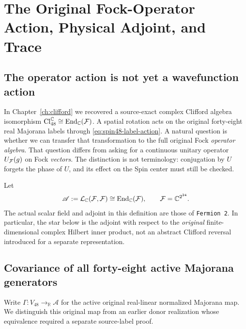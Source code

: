 \chapter[Spin(9) on the Original Fock Algebra]{The Original Fock-Operator Action, Physical Adjoint, and Trace}
\label{ch:fock-action}

\section{The operator action is not yet a wavefunction action}
In Chapter~\ref{ch:clifford} we recovered a source-exact complex Clifford
algebra isomorphism
$\mathrm{Cl}_{48}^{\mathbb C}\cong\operatorname{End}_{\mathbb C}(\mathcal F)$.
A spatial rotation acts on the original forty-eight real Majorana
labels through \eqref{eq:spin48-label-action}. A natural question is
whether we can transfer that transformation to the full original
Fock \emph{operator algebra}. That question differs from asking for a
continuous unitary operator $U_{\mathcal F}(g)$ on Fock \emph{vectors}.
The distinction is not terminology: conjugation by $U$ forgets the
phase of $U$, and its effect on the Spin center must still be checked.

Let
\[
 \mathscr A:=\mathcal L_{\mathbb C}(\mathcal F,\mathcal F)
 \cong \operatorname{End}_{\mathbb C}(\mathcal F),
 \qquad \mathcal F=\mathbb C^{2^{24}}.
\]
The actual scalar field and adjoint in this definition are those of
\texttt{Fermion 2}. In particular, the star below is the adjoint with
respect to the \emph{original} finite-dimensional complex Hilbert
inner product, not an abstract Clifford reversal introduced for a
separate representation.

\section{Covariance of all forty-eight active Majorana generators}
Write $\Gamma:V_{48}\to_{\mathbb R}\mathscr A$ for the active original
real-linear normalized Majorana map. We distinguish this original map
from an earlier donor realization whose equivalence required a separate
source-label proof.

